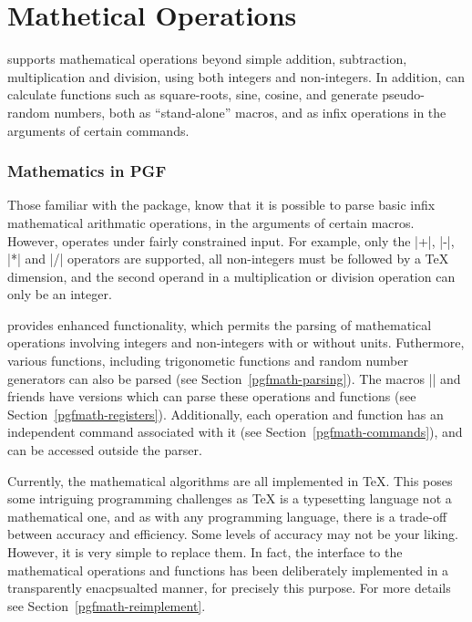 %
%
%
%

\part{Mathetical Operations}
\pgfname{} supports mathematical operations beyond simple addition,
subtraction, multiplication and division, using both integers and 
non-integers. In addition, \pgfname{} can calculate functions such
as square-roots, sine, cosine, and generate pseudo-random numbers, 
both as ``stand-alone'' macros, and as infix operations in the 
arguments of certain commands.
\newpage

\section{Mathematics in PGF}
Those familiar with the \calcname{} package, know that it is 
possible to parse basic infix mathematical arithmatic operations, 
in the arguments of certain macros. 
However, \calcname{} operates under fairly constrained input. 
For example, only the |+|, |-|, |*| and |/| operators are supported, 
all non-integers must be followed by a \TeX{} dimension, and the 
second operand in a multiplication or division operation can only be
 an integer. 

\pgfname{} provides enhanced functionality, which permits the parsing
of mathematical operations involving integers and non-integers 
with or without units. Futhermore, various functions, including
trigonometic functions and random number generators can also be 
parsed (see Section~\ref{pgfmath-parsing}). 
The \calcname{} macros |\setlength| and friends have \pgfname{} versions 
which can parse these operations and functions 
(see Section~\ref{pgfmath-registers}). Additionally, each operation
and function has an independent \pgfname{} command associated with it
(see Section~\ref{pgfmath-commands}), and can be 
accessed outside the parser.

Currently, the mathematical algorithms are all implemented in \TeX.
This poses some intriguing programming challenges as \TeX{} is a
typesetting language not a mathematical one, and as with any 
programming language, there is a trade-off between accuracy and 
efficiency. Some levels of accuracy may not be your liking. 
However, it is very simple to replace them. In fact, the interface to 
the mathematical operations and functions has been deliberately 
implemented in a transparently enacpsualted manner, for precisely this 
purpose. For more details see Section~\ref{pgfmath-reimplement}.

